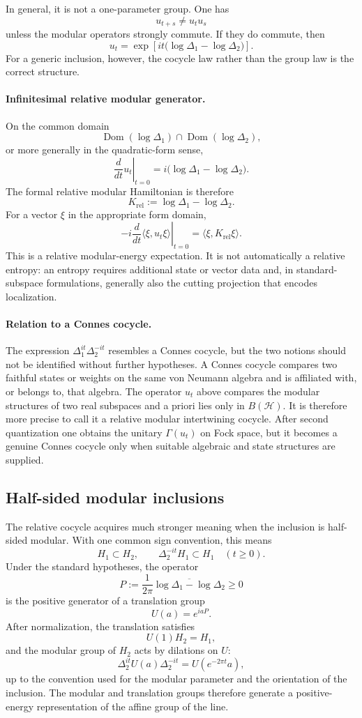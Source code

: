 \documentclass[a4paper,11pt]{article}
\theoremstyle{definition}
\newcommand{\cH}{\mathcal{H}}
\newcommand{\Dom}{\operatorname{Dom}}
\begin{document}
In general, it is not a one-parameter group.  One has
\[
 u_{t+s}\neq u_tu_s
\]
unless the modular operators strongly commute.  If they do commute, then
\[
 u_t
 =\exp\!\left[it\bigl(\log\Delta_1-\log\Delta_2\bigr)\right].
\]
For a generic inclusion, however, the cocycle law rather than the group
law is the correct structure.

\paragraph{Infinitesimal relative modular generator.}
On the common domain
\[
\Dom(\log\Delta_1)\cap\Dom(\log\Delta_2),
\]
or more generally in the quadratic-form sense,
\[
\boxed{
   \left.\frac{d}{dt}u_t\right|_{t=0}
   =i\bigl(\log\Delta_1-\log\Delta_2\bigr).
}
\]
The formal relative modular Hamiltonian is therefore
\[
K_{\mathrm{rel}}
   :=\log\Delta_1-\log\Delta_2.
\]
For a vector $\xi$ in the appropriate form domain,
\[
-i\left.\frac{d}{dt}
  \langle\xi,u_t\xi\rangle\right|_{t=0}
=
\langle\xi,K_{\mathrm{rel}}\xi\rangle.
\]
This is a relative modular-energy expectation.  It is not automatically a
relative entropy: an entropy requires additional state or vector data and,
in standard-subspace formulations, generally also the cutting projection
that encodes localization.

\paragraph{Relation to a Connes cocycle.}
The expression $\Delta_1^{it}\Delta_2^{-it}$ resembles a Connes cocycle,
but the two notions should not be identified without further hypotheses.
A Connes cocycle compares two faithful states or weights on the same von
Neumann algebra and is affiliated with, or belongs to, that algebra.  The
operator $u_t$ above compares the modular structures of two real
subspaces and a priori lies only in $B(\cH)$.  It is therefore more precise
to call it a relative modular intertwining cocycle.  After second
quantization one obtains the unitary $\Gamma(u_t)$ on Fock space, but it
becomes a genuine Connes cocycle only when suitable algebraic and state
structures are supplied.

\subsection*{Half-sided modular inclusions}

The relative cocycle acquires much stronger meaning when the inclusion is
half-sided modular.  With one common sign convention, this means
\[
H_1\subset H_2,
\qquad
\Delta_2^{-it}H_1\subset H_1
\quad (t\geq 0).
\]
Under the standard hypotheses, the operator
\[
\boxed{
P
   :=\frac{1}{2\pi}
      \overline{\log\Delta_1-\log\Delta_2}
   \geq 0
}
\]
is the positive generator of a translation group
\[
U(a)=e^{iaP}.
\]
After normalization, the translation satisfies
\[
U(1)H_2=H_1,
\]
and the modular group of $H_2$ acts by dilations on $U$:
\[
\Delta_2^{it}U(a)\Delta_2^{-it}
   =U(e^{-2\pi t}a),
\]
up to the convention used for the modular parameter and the orientation
of the inclusion.  The modular and translation groups therefore generate
a positive-energy representation of the affine group of the line.
\end{document}
